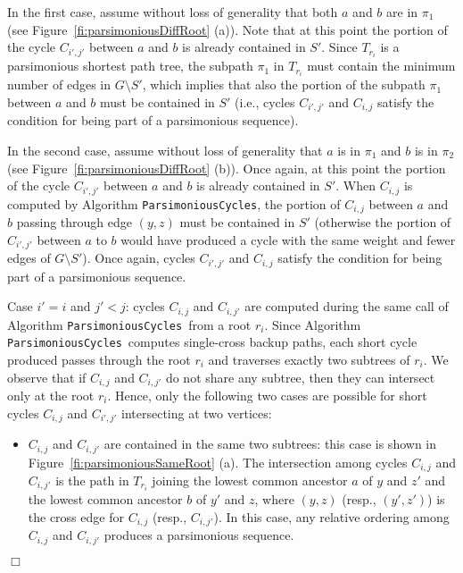 \documentclass{article}
\newcommand{\qed}{\hfill \ensuremath{\Box}}
\newenvironment{proof}{\vspace{1ex}\noindent{\bf Proof.}\hspace{0.5em}}
	{\hfill\qed\vspace{2ex}}
\newcommand{\commento}[1] {}
\newcommand{\ParsimoniousCycles}{\texttt{ParsimoniousCycles}}
\begin{document}
\begin{proof}
\begin{description}
In the first case, assume without loss of generality that both $a$ and $b$ are in $\pi_1$ (see Figure~\ref{fi:parsimoniousDiffRoot} (a)). 
Note that at this point  the portion of the cycle $C_{i',j'}$ between $a$ and $b$ is already contained in $S'$.
Since $T_{r_i}$ is a parsimonious shortest path tree, the subpath $\pi_1$ in $T_{r_i}$ must contain the minimum number of edges in $G \setminus S'$, which implies that 
also the portion of the subpath $\pi_1$ between $a$ and $b$ must be contained in $S'$ (i.e., cycles $C_{i',j'}$ and $C_{i,j}$ satisfy the condition for being part of a parsimonious sequence).

In the second case, assume without loss of generality that $a$ is in $\pi_1$ and $b$ is in $\pi_2$ (see  Figure~\ref{fi:parsimoniousDiffRoot} (b)). Once again, at this point  the portion of the cycle $C_{i',j'}$ between $a$ and $b$ is already contained in $S'$. When $C_{i,j}$ is computed by Algorithm \ParsimoniousCycles, the portion of $C_{i,j}$ between $a$ and $b$ passing through edge $(y,z)$ must be contained in $S'$ (otherwise the portion of $C_{i',j'}$ between $a$ to $b$ would have produced a cycle with the same weight and fewer edges of  $G\setminus S'$).
Once again, cycles $C_{i',j'}$ and $C_{i,j}$ satisfy the condition for being part of a parsimonious sequence.

\commento{An ordered sequence of cycles $C_1, C_2, \ldots, C_q$ is said to be \emph{parsimonious} if the following property holds: for any pair of cycles $C_i$ and $C_j$, with $1\leq i < j \leq q$, if $C_i$ and $C_j$ have two common vertices $x$ and $y$, where $x$ and $y$ split $C_j$ into paths $P'$ and $P''$, then either 
$P' \subseteq \bigcup_{k=1}^{j-1} C_k$ or $P'' \subseteq \bigcup_{k=1}^{j-1} C_k$.
Intuitively speaking, in a parsimonious sequence of cycles, each new cycle $C_j$ reuses as much as possible portions of paths from the union of previous cycles $C_1$, $\ldots$, $C_{j-1}$.
}

\item{Case $i' = i$ and $j'<j$:} cycles $C_{i,j}$ and $C_{i,j'}$ are computed during the same call of Algorithm \ParsimoniousCycles\ from a root $r_i$. Since Algorithm \ParsimoniousCycles\ computes single-cross backup paths, each short cycle produced passes through the root $r_i$ and traverses exactly two subtrees of $r_i$. 
We observe that if $C_{i,j}$ and $C_{i,j'}$ do not share any subtree, then they can intersect only at the root $r_i$.
Hence, only the following two cases are possible for short cycles $C_{i,j}$ and $C_{i',j'}$ intersecting at two vertices:
\begin{itemize}
\item{$C_{i,j}$ and $C_{i,j'}$ are contained in the same two subtrees:} this case is shown in Figure~\ref{fi:parsimoniousSameRoot} (a). The intersection among cycles $C_{i,j}$ and $C_{i,j'}$ is the path in $T_{r_i}$ joining the lowest common ancestor $a$ of $y$ and $z'$ and the lowest common ancestor $b$ of $y'$ and $z$, where $(y,z)$ (resp., $(y',z')$) is the cross edge for $C_{i,j}$ (resp., $C_{i,j'}$). In this case, any relative ordering among $C_{i,j}$ and $C_{i,j'}$ produces a parsimonious sequence. 


\end{itemize}
\end{description}
\end{proof}
\end{document}
